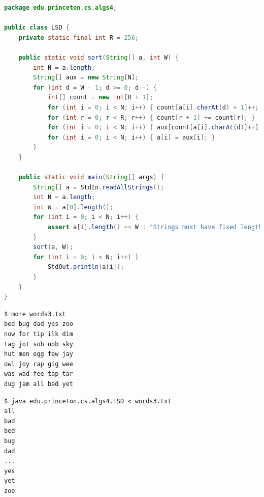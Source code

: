 \documentclass[8pt,a4paper,compress]{beamer}
\begin{document}
\begin{frame}[fragile]
\pause

\begin{lstlisting}[language=Java]
package edu.princeton.cs.algs4;

public class LSD {
    private static final int R = 256; 

    public static void sort(String[] a, int W) {
        int N = a.length;
        String[] aux = new String[N];
        for (int d = W - 1; d >= 0; d--) {
            int[] count = new int[R + 1];
            for (int i = 0; i < N; i++) { count[a[i].charAt(d) + 1]++; }
            for (int r = 0; r < R; r++) { count[r + 1] += count[r]; }
            for (int i = 0; i < N; i++) { aux[count[a[i].charAt(d)]++] = a[i]; }
            for (int i = 0; i < N; i++) { a[i] = aux[i]; }
        }
    }

    public static void main(String[] args) {
        String[] a = StdIn.readAllStrings();
        int N = a.length;
        int W = a[0].length();
        for (int i = 0; i < N; i++) {
            assert a[i].length() == W : "Strings must have fixed length";
        }
        sort(a, W);
        for (int i = 0; i < N; i++) }
            StdOut.println(a[i]);
        }
    }
}
\end{lstlisting}
\end{frame}

\begin{frame}[fragile]
\pause

\begin{lstlisting}[language={}]
$ more words3.txt
bed bug dad yes zoo
now for tip ilk dim 
tag jot sob nob sky
hut men egg few jay
owl joy rap gig wee
was wad fee tap tar
dug jam all bad yet
\end{lstlisting}

\pause

\begin{lstlisting}[language={}]
$ java edu.princeton.cs.algs4.LSD < words3.txt 
all
bad
bed
bug
dad
...
yes
yet
zoo
\end{lstlisting}
\end{frame}
\end{document}
